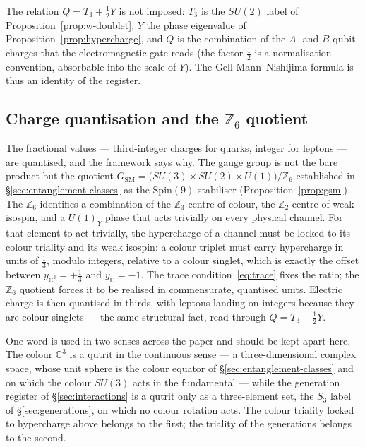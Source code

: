 The relation $Q = T_3 + \tfrac12 Y$ is not imposed: $T_3$ is the $SU(2)$ label of
Proposition~\ref{prop:w-doublet}, $Y$ the phase eigenvalue of Proposition~\ref{prop:hypercharge},
and $Q$ is the combination of the $A$- and $B$-qubit charges that the electromagnetic gate reads
(the factor $\tfrac12$ is a normalisation convention, absorbable into the scale of $Y$).
The Gell-Mann--Nishijima formula is thus an identity of the register.

\subsection{Charge quantisation and the \texorpdfstring{$\mathbb{Z}_6$}{Z6} quotient}

The fractional values --- third-integer charges for quarks, integer for leptons --- are quantised,
and the framework says why. The gauge group is not the bare product but the quotient
$G_{\mathrm{SM}} = \bigl(SU(3)\times SU(2)\times U(1)\bigr)/\mathbb{Z}_6$ established in
\S\ref{sec:entanglement-classes} as the $\mathrm{Spin}(9)$ stabiliser
(Proposition~\ref{prop:gsm}) \autocite{krasnov2021so9}. The $\mathbb{Z}_6$ identifies a combination
of the $\mathbb{Z}_3$ centre of colour, the $\mathbb{Z}_2$ centre of weak isospin, and a $U(1)_Y$
phase that acts trivially on every physical channel. For that element to act trivially, the
hypercharge of a channel must be locked to its colour triality and its weak isospin: a colour
triplet must carry hypercharge in units of $\tfrac13$, modulo integers, relative to a colour
singlet, which is exactly the offset between $y_{\mathbb{C}^3} = +\tfrac13$ and
$y_{\mathbb{C}} = -1$. The trace
condition~\eqref{eq:trace} fixes the ratio; the $\mathbb{Z}_6$ quotient forces it to be realised in
commensurate, quantised units. Electric charge is then quantised in thirds, with leptons landing on
integers because they are colour singlets --- the same structural fact, read through $Q = T_3 +
\tfrac12 Y$.

One word is used in two senses across the paper and should be kept apart here. The colour
$\mathbb{C}^3$ is a qutrit in the continuous sense --- a three-dimensional complex space, whose unit
sphere is the colour equator of \S\ref{sec:entanglement-classes} and on which the colour $SU(3)$
acts in the fundamental --- while the generation register of \S\ref{sec:interactions} is a qutrit
only as a three-element set, the $S_3$ label of \S\ref{sec:generations}, on which no colour
rotation acts. The colour triality locked to hypercharge above belongs to the first; the triality of
the generations belongs to the second.

